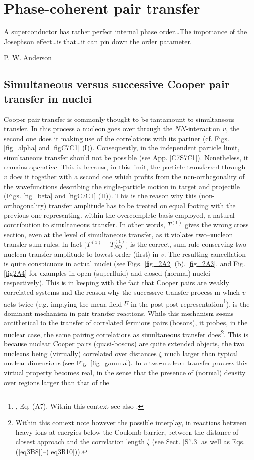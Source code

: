 \chapter{Phase-coherent pair transfer}\label{chapter2}
 \epigraph{A superconductor has rather perfect internal phase order\dots The importance of the Josephson effect\dots is that\dots it can pin down the order parameter.}{P. W. Anderson}
\section{Simultaneous versus successive Cooper pair transfer in nuclei}\label{C2S1}
Cooper pair transfer is commonly thought to be tantamount to simultaneous transfer. In this process a nucleon goes over through the $NN$-interaction $v$, the second one does it making use of the correlations with its partner (cf. Figs. \ref{fig_alpha} and \ref{figC7C1} (I)). Consequently, in the independent particle limit, simultaneous  transfer should not be possible (see App. \ref{C7S7C1}). Nonetheless, it remains operative. This is because, in this limit, the particle transferred through $v$ does it together with a second one which profits from the non-orthogonality of the wavefunctions describing the single-particle motion in target and projectile (Figs. \ref{fig_beta} and \ref{figC7C1} (II)). This is the reason why this (non-orthogonality) transfer amplitude has to be treated on equal footing with  the previous one  representing, within the overcomplete basis employed, a natural contribution to simultaneous transfer. In other words, $T^{(1)}$ gives the wrong cross section, even at the level of simultaneous transfer, as it violates two--nucleon transfer sum rules. In fact ($T^{(1)}-T^{(1)}_{NO}$) is the correct, sum rule conserving two-nucleon transfer amplitude to lowest order (first) in $v$. The resulting cancellation is quite conspicuous in actual nuclei  (see Figs. \ref{fig_2A2} (b), \ref{fig_2A3}, and Fig. \ref{fig2A4} for examples in open (superfluid) and closed (normal) nuclei respectively). This is in keeping with the fact that Cooper pairs are weakly correlated systems and the reason why the successive transfer process in which $v$ acts twice (e.g. implying the mean field $U$ in the post-post representation\footnote{\cite{Bayman:82,Potel:13}, Eq. (A7). Within this context see also \cite{Pinkston:82}.}), is the dominant mechanism in pair transfer reactions. While this mechanism seems antithetical to the transfer of  correlated fermions pairs (bosons), it probes, in the nuclear case, the same pairing correlations as simultaneous transfer does\footnote{Within this context note however the possible interplay, in reactions between heavy ions at energies below the Coulomb barrier, between the distance of closest approach and the correlation length $\xi$ (see Sect. \ref{S7.3} as well as Eqs. (\ref{eq3B8})--(\ref{eq3B10})).}. This is because nuclear Cooper pairs (quasi-bosons) are quite extended objects, the two nucleons being (virtually) correlated over distances $\xi$ much larger than typical nuclear dimensions (see Fig. \ref{fig_gamma}). In a two-nucleon transfer process this virtual property becomes real, in the sense that the presence of (normal) density over regions larger than that of the 